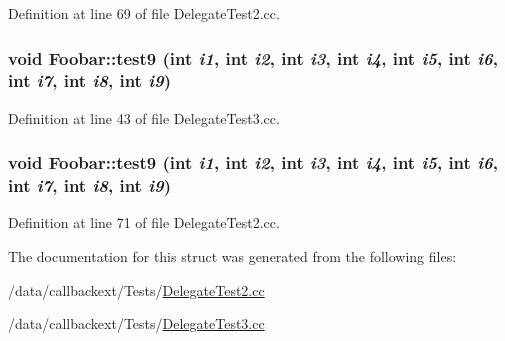 Definition at line 69 of file Delegate\-Test2.cc.\hypertarget{structFoobar_a20}{
\subsubsection[test9]{\setlength{\rightskip}{0pt plus 5cm}void Foobar::test9 (int {\em i1}, int {\em i2}, int {\em i3}, int {\em i4}, int {\em i5}, int {\em i6}, int {\em i7}, int {\em i8}, int {\em i9})}}
\label{structFoobar_a20}




Definition at line 43 of file Delegate\-Test3.cc.\hypertarget{structFoobar_a9}{
\subsubsection[test9]{\setlength{\rightskip}{0pt plus 5cm}void Foobar::test9 (int {\em i1}, int {\em i2}, int {\em i3}, int {\em i4}, int {\em i5}, int {\em i6}, int {\em i7}, int {\em i8}, int {\em i9})}}
\label{structFoobar_a9}




Definition at line 71 of file Delegate\-Test2.cc.

The documentation for this struct was generated from the following files:\begin{CompactItemize}
\item 
/data/callbackext/Tests/\hyperlink{DelegateTest2_8cc}{Delegate\-Test2.cc}\item 
/data/callbackext/Tests/\hyperlink{DelegateTest3_8cc}{Delegate\-Test3.cc}\end{CompactItemize}
